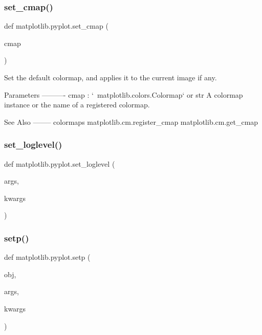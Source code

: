 \subsubsection{\texorpdfstring{set\+\_\+cmap()}{set\_cmap()}}
{\footnotesize\ttfamily def matplotlib.\+pyplot.\+set\+\_\+cmap (\begin{DoxyParamCaption}\item[{}]{cmap }\end{DoxyParamCaption})}

\begin{DoxyVerb}Set the default colormap, and applies it to the current image if any.

Parameters
----------
cmap : `~matplotlib.colors.Colormap` or str
    A colormap instance or the name of a registered colormap.

See Also
--------
colormaps
matplotlib.cm.register_cmap
matplotlib.cm.get_cmap
\end{DoxyVerb}
 \mbox{\label{namespacematplotlib_1_1pyplot_a72c34025eed7bcda9c38580421e609c0}} 
\subsubsection{\texorpdfstring{set\+\_\+loglevel()}{set\_loglevel()}}
{\footnotesize\ttfamily def matplotlib.\+pyplot.\+set\+\_\+loglevel (\begin{DoxyParamCaption}\item[{}]{args,  }\item[{}]{kwargs }\end{DoxyParamCaption})}

\mbox{\label{namespacematplotlib_1_1pyplot_aefe6ffadf5b9f1c2b6f530cf0a9590ee}} 
\subsubsection{\texorpdfstring{setp()}{setp()}}
{\footnotesize\ttfamily def matplotlib.\+pyplot.\+setp (\begin{DoxyParamCaption}\item[{}]{obj,  }\item[{}]{args,  }\item[{}]{kwargs }\end{DoxyParamCaption})}

